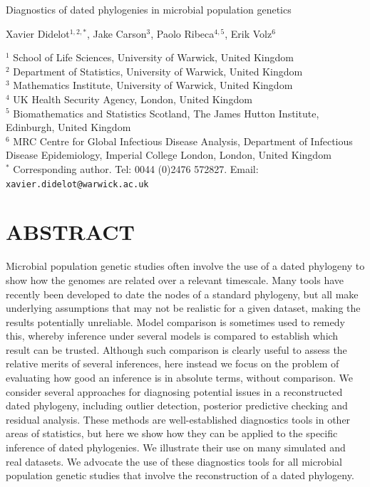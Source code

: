\documentclass{article}
\begin{document}
{\Large Diagnostics of dated phylogenies in microbial population genetics}


\vspace*{2cm}
Xavier Didelot$^{1,2,*}$, Jake Carson$^{3}$, Paolo Ribeca$^{4,5}$, Erik Volz$^6$

\vspace*{2cm}
$^1$ School of Life Sciences, University of Warwick, United Kingdom\\
$^2$ Department of Statistics, University of Warwick, United Kingdom\\
$^3$ Mathematics Institute, University of Warwick, United Kingdom\\
$^4$ UK Health Security Agency, London, United Kingdom\\
$^5$ Biomathematics and Statistics Scotland, The James Hutton Institute, Edinburgh, United Kingdom\\
$^6$ MRC Centre for Global Infectious Disease Analysis, Department of Infectious Disease Epidemiology, Imperial College London, London, United Kingdom\\
$^*$ Corresponding author. Tel: 0044 (0)2476 572827. Email: \verb+xavier.didelot@warwick.ac.uk+

\newpage
\section*{ABSTRACT}
Microbial population genetic studies often involve the use of a dated phylogeny
to show how the genomes are related over a relevant timescale. 
Many tools have recently been developed to date
the nodes of a standard phylogeny, but all make underlying assumptions that may
not be realistic for a given dataset, making the results potentially unreliable. 
Model comparison is sometimes used to remedy this, whereby inference
under several models is compared to establish which result can be trusted.
Although such comparison is clearly useful to assess the relative merits
of several inferences, here instead we focus on the problem
of evaluating how good an inference is in absolute terms, without comparison.
We consider several approaches for diagnosing potential issues
in a reconstructed dated phylogeny, including outlier detection, 
posterior predictive checking and residual analysis. These methods are
well-established diagnostics tools in other areas of statistics, but here
we show how they can be applied to the specific inference of
dated phylogenies. We illustrate their use on many simulated and real datasets.
We advocate the use of these diagnostics tools for all microbial population genetic
studies that involve the reconstruction of a dated phylogeny.
\end{document}
